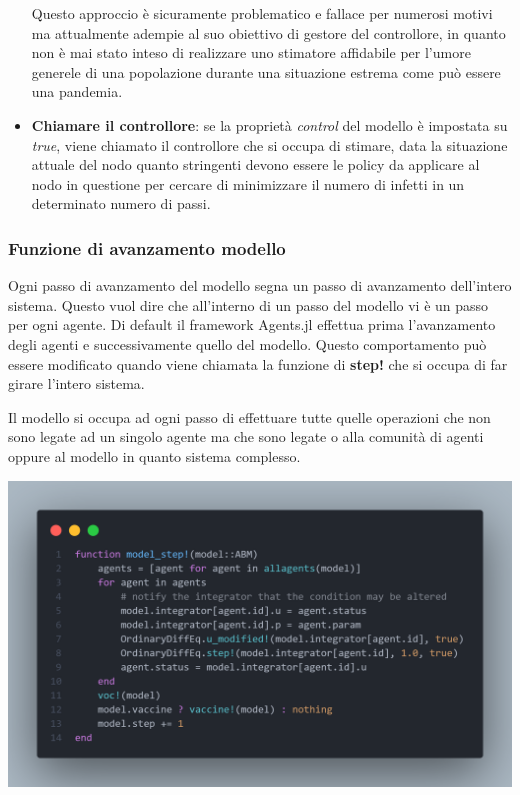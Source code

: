 \begin{itemize}
	Questo approccio è sicuramente problematico e fallace per numerosi motivi ma attualmente 
	adempie al suo obiettivo di gestore del controllore, in quanto non è mai stato inteso di 
	realizzare uno stimatore affidabile per l'umore generele di una popolazione durante una situazione
	estrema come può essere una pandemia.
	\item \textbf{Chiamare il controllore}: se la proprietà \emph{control} del modello è impostata su
	\emph{true}, viene chiamato il controllore che si occupa di stimare, data la situazione attuale del nodo
	quanto stringenti devono essere le policy da applicare al nodo in questione per cercare di minimizzare il 
	numero di infetti in un determinato numero di passi. 
\end{itemize}

\subsubsection{Funzione di avanzamento modello}
Ogni passo di avanzamento del modello segna un passo di avanzamento dell'intero sistema. 
Questo vuol dire che all'interno di un passo del modello vi è un passo per ogni agente. Di default
il framework Agents.jl effettua prima l'avanzamento degli agenti e successivamente quello del modello.
Questo comportamento può essere modificato quando viene chiamata la funzione di \textbf{step!} che 
si occupa di far girare l'intero sistema.

Il modello si occupa ad ogni passo di effettuare tutte quelle operazioni che non sono legate ad un
singolo agente ma che sono legate o alla comunità di agenti oppure al modello in quanto sistema complesso. 

\begin{minipage}{\linewidth}
	\centering
	\includegraphics[width=\textwidth]{img/model_step.png}
	\label{fig:model_step}
\end{minipage}

